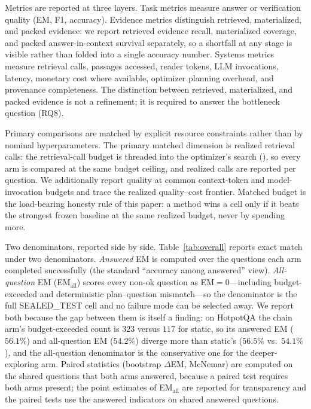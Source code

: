 Metrics are reported at three layers. Task metrics measure answer or
verification quality (EM, F1, accuracy). Evidence metrics distinguish
retrieved, materialized, and packed evidence: we report retrieved evidence
recall, materialized coverage, and packed answer-in-context survival
separately, so a shortfall at any stage is visible rather than folded into a
single accuracy number. Systems metrics measure retrieval calls, passages
accessed, reader tokens, LLM invocations, latency, monetary cost where
available, optimizer planning overhead, and provenance completeness. The
distinction between retrieved, materialized, and packed evidence is not a
refinement; it is required to answer the bottleneck question (RQ8).

Primary comparisons are matched by explicit resource constraints rather than by
nominal hyperparameters. The primary matched dimension is realized retrieval
calls: the retrieval-call budget is threaded into the optimizer's search
(), so every arm is compared at the same budget
ceiling, and realized calls are reported per question. We additionally report
quality at common context-token and model-invocation budgets and trace the
realized quality--cost frontier. Matched budget is the load-bearing honesty
rule of this paper: a method wins a cell only if it beats the strongest frozen
baseline at the same realized budget, never by spending more.

Two denominators, reported side by side. Table~\ref{tab:overall} reports exact
match under two denominators. \emph{Answered} EM is computed over the questions
each arm completed successfully (the standard ``accuracy among answered''
view). \emph{All-question} EM (EM$_{\text{all}}$) scores every non-ok question
as EM$=0$---including budget-exceeded and deterministic plan--question
mismatch---so the denominator is the full SEALED\_TEST cell and no failure mode
can be selected away. We report both because the gap between them is itself a
finding: on HotpotQA the chain arm's budget-exceeded count is $323$ versus
$117$ for static, so its answered EM ($56.1\%$) and all-question EM ($54.2\%$)
diverge more than static's ($56.5\%$ vs.\ $54.1\%$), and the all-question
denominator is the conservative one for the deeper-exploring arm. Paired
statistics (bootstrap $\Delta$EM, McNemar) are computed on the shared questions
that both arms answered, because a paired test requires both arms present; the
point estimates of EM$_{\text{all}}$ are reported for transparency and the
paired tests use the answered indicators on shared answered questions.

